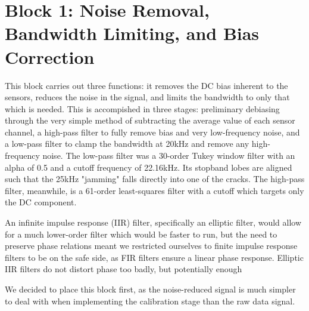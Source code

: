 
\section{Block 1: Noise Removal, Bandwidth Limiting, and Bias Correction}

This block carries out three functions: it removes the DC bias inherent to the sensors, reduces the noise
 in the signal, and limits the bandwidth to only that which is needed. This is accompished in three stages:
 preliminary debiasing through the very simple method of subtracting the average value of each sensor channel,
 a high-pass filter to fully remove bias and very low-frequency noise, and a low-pass filter to clamp the
 bandwidth at 20kHz and remove any high-frequency noise. The low-pass filter was a 30-order Tukey window filter
 with an alpha of 0.5 and a cutoff frequency of 22.16kHz. Its stopband lobes are aligned such that the 25kHz
 "jamming" falls directly into one of the cracks.  The high-pass filter, meanwhile, is a 61-order least-squares
 filter with a cutoff which targets only the DC component.

An infinite impulse response (IIR) filter, specifically an elliptic filter, would allow for a much lower-order
 filter which would be faster to run, but the need to preserve phase relations meant we restricted ourselves to
 finite impulse response filters to be on the safe side, as FIR filters ensure a linear phase response. Elliptic
 IIR filters do not distort phase too badly, but potentially enough

We decided to place this block first, as the noise-reduced signal is much simpler to deal with when implementing
 the calibration stage than the raw data signal.